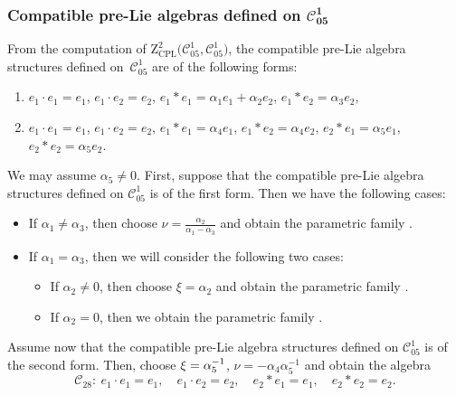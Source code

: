 \documentclass[pdftex]{sigma}
\numberwithin{equation}{section}
\begin{document}
\subsubsection[Compatible pre-Lie algebras defined on C\_\{05\}\^{}1]{Compatible pre-Lie algebras defined on $\boldsymbol{\mathcal{C}_{05}^{1}}$}

From the computation of $\mathrm{Z}_{\mathrm{CPL}}^{2}\bigl(\mathcal{C}_{05}^{1},%
\mathcal{C}_{05}^{1}\bigr)$, the compatible pre-Lie algebra structures defined on~$\mathcal{C}_{05}^{1}$ are of the following forms:
\begin{enumerate}\itemsep=0pt
\item[(1)] $e_{1}\cdot e_{1}=e_{1}$, $e_{1}\cdot e_{2}=e_{2}$,
$e_{1}\ast e_{1}=\alpha _{1}e_{1}+\alpha _{2}e_{2}$, $e_{1}\ast
e_{2}=\alpha _{3}e_{2}$,
\item[(2)] $e_{1}\cdot e_{1}=e_{1}$, $e_{1}\cdot e_{2}=e_{2}$,
$e_{1}\ast e_{1}=\alpha _{4}e_{1}$, $e_{1}\ast e_{2}=\alpha _{4}e_{2}$, $e_{2}\ast e_{1}=\alpha _{5}e_{1}$, $e_{2}\ast e_{2}=\alpha _{5}e_{2}$.
\end{enumerate}

We may assume $\alpha _{5}\neq 0$.
First, suppose that the compatible
pre-Lie algebra structures defined on $\mathcal{C}_{05}^{1}$ is of the first
form. Then we have the following cases:
\begin{itemize}\itemsep=0pt
\item If $\alpha _{1}\neq\alpha _{3}$, then choose $\nu =\frac{\alpha _{2}%
}{\alpha _{1}-\alpha _{3}}$ and obtain the parametric family .

\item If $\alpha _{1}=\alpha _{3}$, then we will consider the following two cases:
\begin{itemize}\itemsep=0pt
\item If $\alpha _{2}\neq 0$, then choose $\xi =\alpha _{2}$ and
obtain the parametric family .
\item If $\alpha _{2}=0$, then we obtain the parametric family .
\end{itemize}
\end{itemize}

Assume now that the compatible pre-Lie algebra structures defined on $%
\mathcal{C}_{05}^{1}$ is of the second form. Then, choose $\xi ={%
\alpha^{-1} _{5}}$, $\nu =-{\alpha _{4}}{\alpha^{-1} _{5}}$ and obtain the algebra
\[
\mathcal{C}_{28} \colon \
e_{1}\cdot e_{1}=e_{1}, \quad e_{1}\cdot e_{2}=e_{2}, \quad
e_{2}\ast e_{1}=e_{1},\quad e_{2}\ast e_{2}=e_{2}.
\]
\end{document}
